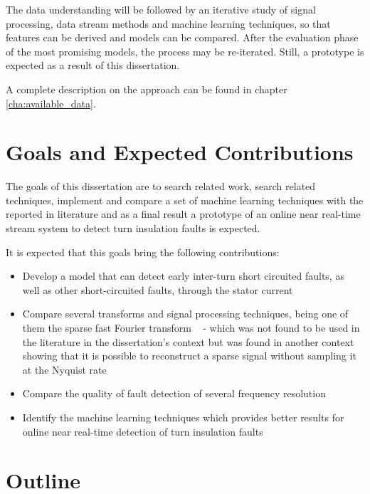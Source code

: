 The data understanding will be followed by an iterative study of signal processing, data stream methods and machine learning techniques, so that features can be derived and models can be compared.
After the evaluation phase of the most promising models, the process may be re-iterated. Still, a prototype is expected as a result of this dissertation.

A complete description on the approach can be found in chapter \ref{cha:available_data}.






\section{Goals and Expected Contributions} %
\label{sec:contributions}

The goals of this dissertation are to search related work, search related techniques, implement and compare a set of machine learning techniques with the reported in literature and as a final result a prototype of an online  near real-time stream system to detect turn insulation faults is expected.

It is expected that this goals bring the following contributions:


\begin{itemize}
  \item 
  Develop a model that can detect early inter-turn short circuited faults, as well as other short-circuited faults, through the stator current
  \item 
  Compare several transforms and signal processing techniques, being one of them the sparse fast Fourier transform  ~\cite{Indyk2014} - which was not found to be used in the literature in the dissertation's context but was found in another context showing that it is possible to reconstruct a sparse signal without sampling it at the Nyquist rate ~\cite{Hassanieh2014}
  \item 
  Compare the quality of fault detection of several frequency resolution
  \item 
  Identify the machine learning techniques which provides better results for online near real-time detection of turn insulation faults
\end{itemize}


\section{Outline} %
\label{sec:outline}

